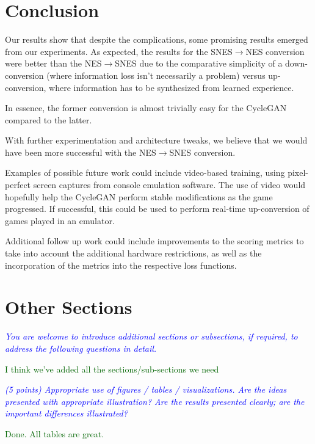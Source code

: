 \documentclass[10pt,twocolumn,letterpaper]{article}
\begin{document}
\section{Conclusion}

Our results show that despite the complications, some promising results emerged from our experiments. As expected, the results for the SNES$\rightarrow$NES conversion were better than the NES$\rightarrow$SNES due to the comparative simplicity of a down-conversion (where information loss isn't necessarily a problem) versus up-conversion, where information has to be synthesized from learned experience.

In essence, the former conversion is almost trivially easy for the CycleGAN compared to the latter. 

With further experimentation and architecture tweaks, we believe that we would have been more successful with the NES$\rightarrow$SNES conversion. 

Examples of possible future work could include video-based training, using pixel-perfect screen captures from console emulation software. The use of video would hopefully help the CycleGAN perform stable modifications as the game progressed. If successful, this could be used to perform real-time up-conversion of games played in an emulator.

 Additional follow up work could include improvements to the scoring metrics to take into account the additional hardware restrictions, as well as the incorporation of the metrics into the respective loss functions.

\section{Other Sections}

\textit{\textcolor{blue}{You are welcome to introduce additional sections or subsections, if required, to address the following questions in detail.}}

\textcolor{darkgreen}{I think we've added all the sections/sub-sections we need}

\textit{\textcolor{blue}{(5 points) Appropriate use of figures / tables / visualizations. Are the ideas presented with appropriate illustration? Are the results presented clearly; are the important differences illustrated?}}

\textcolor{darkgreen}{Done. All tables are great.}
\end{document}
